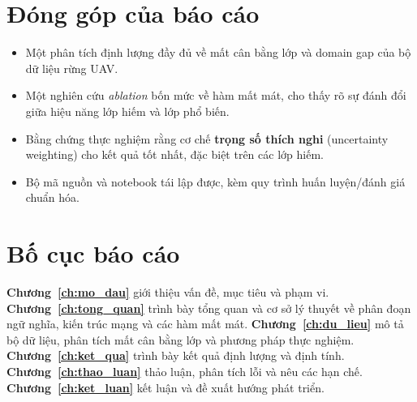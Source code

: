 \section{Đóng góp của báo cáo}

\begin{itemize}[leftmargin=1.4cm]
  \item Một phân tích định lượng đầy đủ về mất cân bằng lớp và domain gap của bộ dữ
  liệu rừng UAV.
  \item Một nghiên cứu \textit{ablation} bốn mức về hàm mất mát, cho thấy rõ sự đánh
  đổi giữa hiệu năng lớp hiếm và lớp phổ biến.
  \item Bằng chứng thực nghiệm rằng cơ chế \textbf{trọng số thích nghi}
  (uncertainty weighting) cho kết quả tốt nhất, đặc biệt trên các lớp hiếm.
  \item Bộ mã nguồn và notebook tái lập được, kèm quy trình huấn luyện/đánh giá
  chuẩn hóa.
\end{itemize}

\section{Bố cục báo cáo}

\textbf{Chương~\ref{ch:mo_dau}} giới thiệu vấn đề, mục tiêu và phạm vi.
\textbf{Chương~\ref{ch:tong_quan}} trình bày tổng quan và cơ sở lý thuyết về phân
đoạn ngữ nghĩa, kiến trúc mạng và các hàm mất mát.
\textbf{Chương~\ref{ch:du_lieu}} mô tả bộ dữ liệu, phân tích mất cân bằng lớp và
phương pháp thực nghiệm.
\textbf{Chương~\ref{ch:ket_qua}} trình bày kết quả định lượng và định tính.
\textbf{Chương~\ref{ch:thao_luan}} thảo luận, phân tích lỗi và nêu các hạn chế.
\textbf{Chương~\ref{ch:ket_luan}} kết luận và đề xuất hướng phát triển.
